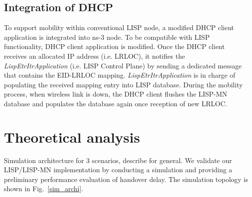 \subsection{Integration of DHCP}
\label{subsec:DHCP}
To support mobility within conventional LISP node, a modified DHCP client application is integrated into ns-3 node. To be compatible with LISP functionality, DHCP client application is modified. Once the DHCP client receives an allocated IP address (i.e. LRLOC), it notifies the \emph{LispEtrItrApplication} (i.e. LISP Control Plane) by sending a dedicated message that contains the EID-LRLOC mapping. \emph{LispEtrItrApplication} is in charge of populating the received mapping entry into LISP database. During the mobility process, when wireless link is down, the DHCP client flushes the LISP-MN database and populates the database again once reception of new LRLOC. 



\section{Theoretical analysis}
\label{sec:ns3_analysis}
Simulation architecture for 3 scenarios, describe for general.
We validate our LISP/LISP-MN implementation by conducting a simulation and providing a preliminary performance evaluation of handover delay. The simulation topology is shown in Fig.~\ref{sim_archi}.


